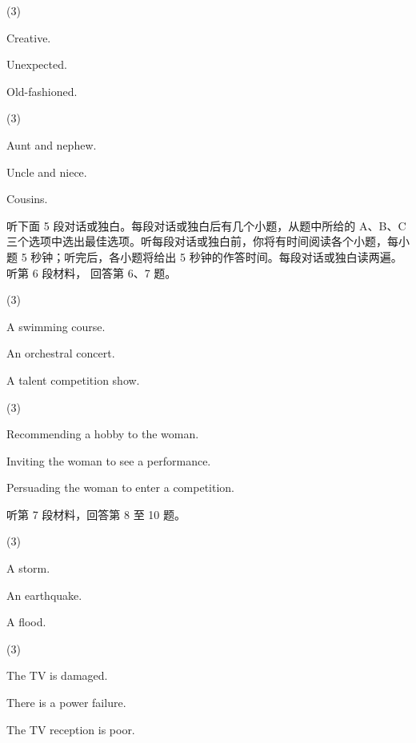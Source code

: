 \documentclass{英语试卷}
\begin{document}
\begin{choices}(3)
  \item Creative.
  \item Unexpected.
  \item Old-fashioned.
\end{choices}
\begin{choices}(3)
  \item Aunt and nephew.
  \item Uncle and niece.
  \item Cousins.
\end{choices}
\par 听下面 5 段对话或独白。每段对话或独白后有几个小题，从题中所给的 A、B、C 三个选项中选出最佳选项。听每段对话或独白前，你将有时间阅读各个小题，每小题 5 秒钟；听完后，各小题将给出 5 秒钟的作答时间。每段对话或独白读两遍。 听第 6 段材料， 回答第 6、7 题。\par
{}
\begin{choices}(3)
  \item A swimming course.
  \item An orchestral concert.
  \item A talent competition show.
\end{choices}
\begin{choices}(3)
  \item Recommending a hobby to the woman.
  \item Inviting the woman to see a performance.
  \item Persuading the woman to enter a competition.
\end{choices}
\par 听第 7 段材料，回答第 8 至 10 题。\par
{}
\begin{choices}(3)
  \item A storm.
  \item An earthquake.
  \item A flood.
\end{choices}
\begin{choices}(3)
  \item The TV is damaged.
  \item There is a power failure.
  \item The TV reception is poor.
\end{choices}
\end{document}
